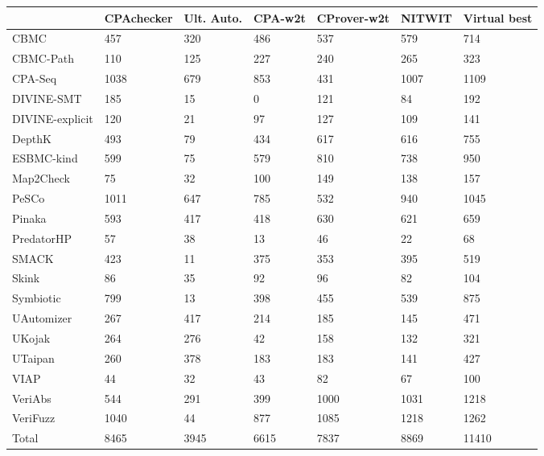 \documentclass[notitlepage]{article}
\begin{document}
\begin{landscape}\begin{tabular}{lllllll}
\toprule
{} & CPAchecker & Ult. Auto. & CPA-w2t & CProver-w2t & NITWIT & Virtual best \\
\midrule
CBMC            &        457 &        320 &     486 &         537 &    579 &          714 \\
CBMC-Path       &        110 &        125 &     227 &         240 &    265 &          323 \\
CPA-Seq         &       1038 &        679 &     853 &         431 &   1007 &         1109 \\
DIVINE-SMT      &        185 &         15 &       0 &         121 &     84 &          192 \\
DIVINE-explicit &        120 &         21 &      97 &         127 &    109 &          141 \\
DepthK          &        493 &         79 &     434 &         617 &    616 &          755 \\
ESBMC-kind      &        599 &         75 &     579 &         810 &    738 &          950 \\
Map2Check       &         75 &         32 &     100 &         149 &    138 &          157 \\
PeSCo           &       1011 &        647 &     785 &         532 &    940 &         1045 \\
Pinaka          &        593 &        417 &     418 &         630 &    621 &          659 \\
PredatorHP      &         57 &         38 &      13 &          46 &     22 &           68 \\
SMACK           &        423 &         11 &     375 &         353 &    395 &          519 \\
Skink           &         86 &         35 &      92 &          96 &     82 &          104 \\
Symbiotic       &        799 &         13 &     398 &         455 &    539 &          875 \\
UAutomizer      &        267 &        417 &     214 &         185 &    145 &          471 \\
UKojak          &        264 &        276 &      42 &         158 &    132 &          321 \\
UTaipan         &        260 &        378 &     183 &         183 &    141 &          427 \\
VIAP            &         44 &         32 &      43 &          82 &     67 &          100 \\
VeriAbs         &        544 &        291 &     399 &        1000 &   1031 &         1218 \\
VeriFuzz        &       1040 &         44 &     877 &        1085 &   1218 &         1262 \\
Total           &       8465 &       3945 &    6615 &        7837 &   8869 &        11410 \\
\bottomrule
\end{tabular}
\end{landscape}
\end{document}
